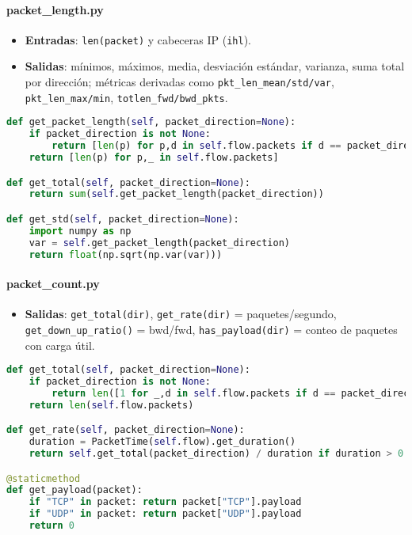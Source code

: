 \paragraph{packet\_length.py}

\begin{itemize}
  \item \textbf{Entradas}: \texttt{len(packet)} y cabeceras IP (\texttt{ihl}).
  \item \textbf{Salidas}: mínimos, máximos, media, desviación estándar, varianza, suma total por dirección; métricas derivadas como \texttt{pkt\_len\_mean/std/var}, \texttt{pkt\_len\_max/min}, \texttt{totlen\_fwd/bwd\_pkts}.
\end{itemize}

\begin{lstlisting}[language=Python,caption={Estadísticas de longitudes (extracto)},label=List.PacketLength]
def get_packet_length(self, packet_direction=None):
    if packet_direction is not None:
        return [len(p) for p,d in self.flow.packets if d == packet_direction]
    return [len(p) for p,_ in self.flow.packets]

def get_total(self, packet_direction=None):
    return sum(self.get_packet_length(packet_direction))

def get_std(self, packet_direction=None):
    import numpy as np
    var = self.get_packet_length(packet_direction)
    return float(np.sqrt(np.var(var)))
\end{lstlisting}

\paragraph{packet\_count.py}

\begin{itemize}
  \item \textbf{Salidas}: \texttt{get\_total(dir)}, \texttt{get\_rate(dir)} = paquetes/segundo, \texttt{get\_down\_up\_ratio()} = bwd/fwd, \texttt{has\_payload(dir)} = conteo de paquetes con carga útil.
\end{itemize}

\begin{lstlisting}[language=Python,caption={Conteos y tasas de paquetes (extracto)},label=List.PacketCount]
def get_total(self, packet_direction=None):
    if packet_direction is not None:
        return len([1 for _,d in self.flow.packets if d == packet_direction])
    return len(self.flow.packets)

def get_rate(self, packet_direction=None):
    duration = PacketTime(self.flow).get_duration()
    return self.get_total(packet_direction) / duration if duration > 0 else 0.0

@staticmethod
def get_payload(packet):
    if "TCP" in packet: return packet["TCP"].payload
    if "UDP" in packet: return packet["UDP"].payload
    return 0
\end{lstlisting}

